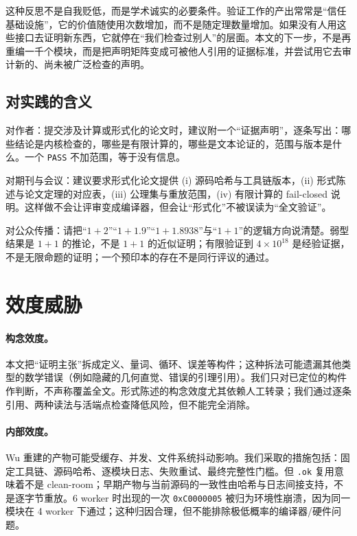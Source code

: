 \documentclass[11pt,a4paper]{ctexart}
\theoremstyle{plain}
\theoremstyle{definition}
\begin{document}
这种反思不是自我贬低，而是学术诚实的必要条件。验证工作的产出常常是“信任基础设施”，它的价值随使用次数增加，而不是随定理数量增加。如果没有人用这些接口去证明新东西，它就停在“我们检查过别人”的层面。本文的下一步，不是再重编一千个模块，而是把声明矩阵变成可被他人引用的证据标准，并尝试用它去审计新的、尚未被广泛检查的声明。

\subsection{对实践的含义}
\label{sec:implications}

对作者：提交涉及计算或形式化的论文时，建议附一个“证据声明”，逐条写出：哪些结论是内核检查的，哪些是有限计算的，哪些是文本论证的，范围与版本是什么。一个 \texttt{PASS} 不加范围，等于没有信息。

对期刊与会议：建议要求形式化论文提供 (i) 源码哈希与工具链版本，(ii) 形式陈述与论文定理的对应表，(iii) 公理集与重放范围，(iv) 有限计算的 fail-closed 说明。这样做不会让评审变成编译器，但会让“形式化”不被误读为“全文验证”。

对公众传播：请把“$1+2$”“$1+1.9$”“$1+1.8938$”与“$1+1$”的逻辑方向说清楚。弱型结果是 $1+1$ 的推论，不是 $1+1$ 的近似证明；有限验证到 $4\times10^{18}$ 是经验证据，不是无限命题的证明；一个预印本的存在不是同行评议的通过。

\section{效度威胁}
\label{sec:threats}

\paragraph{构念效度。}
本文把“证明主张”拆成定义、量词、循环、误差等构件；这种拆法可能遗漏其他类型的数学错误（例如隐藏的几何直觉、错误的引理引用）。我们只对已定位的构件作判断，不声称覆盖全文。形式陈述的构念效度尤其依赖人工转录；我们通过逐条引用、两种读法与活端点检查降低风险，但不能完全消除。

\paragraph{内部效度。}
Wu 重建的产物可能受缓存、并发、文件系统抖动影响。我们采取的措施包括：固定工具链、源码哈希、逐模块日志、失败重试、最终完整性门槛。但 \texttt{.ok} 复用意味着不是 clean-room；早期产物与当前源码的一致性由哈希与日志间接支持，不是逐字节重放。6 worker 时出现的一次 \texttt{0xC0000005} 被归为环境性崩溃，因为同一模块在 4 worker 下通过；这种归因合理，但不能排除极低概率的编译器/硬件问题。
\end{document}
